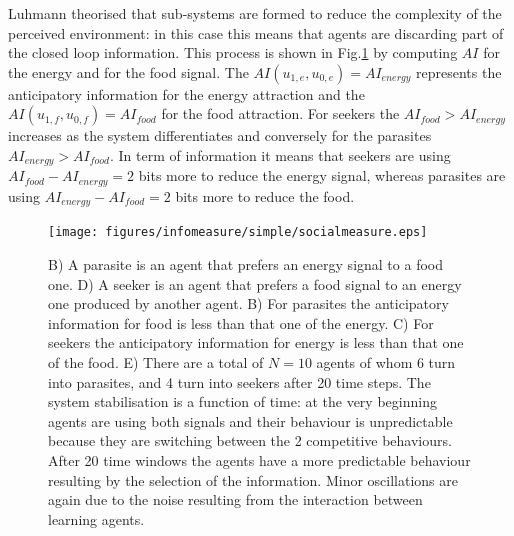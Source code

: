 Luhmann theorised that sub-systems are formed to reduce the complexity of the perceived environment:
in this case this means that agents are discarding part of the closed loop information.
This process is shown in Fig.\ref{social:learning1} by computing $AI$ for the energy and for the food signal.
The $AI(u_{1,e},u_{0,e})=AI_{energy}$ represents the anticipatory information for the energy attraction and the $AI(u_{1,f},u_{0,f})=AI_{food}$ for the food attraction.
For seekers the $AI_{food}>AI_{energy}$ increases as the system differentiates and conversely for the parasites $AI_{energy}>AI_{food}$.
In term of information it means that seekers are using $AI_{food}-AI_{energy}=2$ bits more to reduce the energy signal, whereas parasites are using $AI_{energy}-AI_{food}=2$ bits more to reduce the food.
\begin{figure}[!htbp]
\begin{center}
\texttt{[image: figures/infomeasure/simple/socialmeasure.eps]}
\end{center}
\caption[Max correlation and learning in the simplified case]{B) A parasite is an agent that prefers an energy signal to a food one.  D) A seeker is an agent that prefers a food signal to an energy one produced by another agent. B) For parasites the anticipatory information for food is less than that one of the energy. C) For seekers the anticipatory information for energy is less than that one of
the food. E) There are a total of $N=10$ agents of whom 6 turn into parasites, and 4 turn into seekers after 20 time steps. The system stabilisation is a function of time: at the very
beginning agents are using both signals and their behaviour is unpredictable because they are switching between the 2 competitive behaviours.
After 20 time windows the agents have a more predictable behaviour resulting by the selection of the information. Minor oscillations are again
due to the noise resulting from the interaction between learning agents.\label{social:learning1}}

\end{figure}


